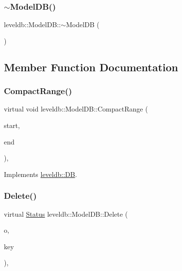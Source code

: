\subsubsection{\texorpdfstring{$\sim$ModelDB()}{~ModelDB()}}
{\footnotesize\ttfamily leveldb\+::\+Model\+D\+B\+::$\sim$\+Model\+DB (\begin{DoxyParamCaption}{ }\end{DoxyParamCaption})\hspace{0.3cm}{\ttfamily [inline]}}



\subsection{Member Function Documentation}
\mbox{\label{classleveldb_1_1_model_d_b_a7a04a6e5227079f861c26b920df6b833}} 
\subsubsection{\texorpdfstring{CompactRange()}{CompactRange()}}
{\footnotesize\ttfamily virtual void leveldb\+::\+Model\+D\+B\+::\+Compact\+Range (\begin{DoxyParamCaption}\item[{const \mbox{\hyperlink{classleveldb_1_1_slice}{Slice}} $\ast$}]{start,  }\item[{const \mbox{\hyperlink{classleveldb_1_1_slice}{Slice}} $\ast$}]{end }\end{DoxyParamCaption})\hspace{0.3cm}{\ttfamily [inline]}, {\ttfamily [virtual]}}



Implements \mbox{\hyperlink{classleveldb_1_1_d_b_aeea500cbc6704454b3be6908d5da8b3a}{leveldb\+::\+DB}}.

\mbox{\label{classleveldb_1_1_model_d_b_a2c2690e07a206fd2197f592dd4478ff6}} 
\subsubsection{\texorpdfstring{Delete()}{Delete()}}
{\footnotesize\ttfamily virtual \mbox{\hyperlink{classleveldb_1_1_status}{Status}} leveldb\+::\+Model\+D\+B\+::\+Delete (\begin{DoxyParamCaption}\item[{const \mbox{\hyperlink{structleveldb_1_1_write_options}{Write\+Options}} \&}]{o,  }\item[{const \mbox{\hyperlink{classleveldb_1_1_slice}{Slice}} \&}]{key }\end{DoxyParamCaption})\hspace{0.3cm}{\ttfamily [inline]}, {\ttfamily [virtual]}}



